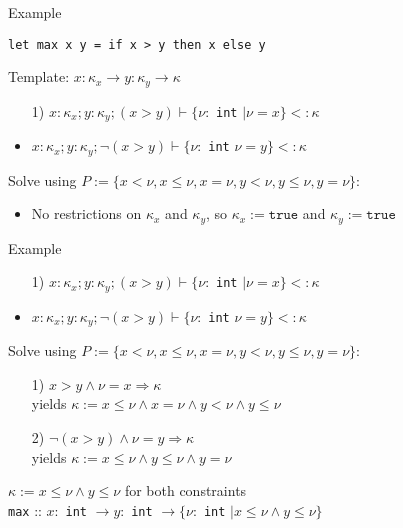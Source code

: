 \documentclass[pdf]{beamer}
\begin{document}
\begin{frame}[fragile]{Example}
  \begin{lstlisting}
let max x y = if x > y then x else y
  \end{lstlisting}
  Template: $x: \kappa_x \rightarrow y: \kappa_y \rightarrow \kappa$
  \begin{itemize}
    \item[1)] $x: \kappa_x; y: \kappa_y; (x > y) \vdash \{\nu:$ \lstinline{int} $\mid \nu = x \} <: \kappa$
    \item[2)] $x: \kappa_x; y: \kappa_y; \neg(x > y) \vdash \{\nu:$ \lstinline{int} $\nu = y \} <: \kappa$
  \end{itemize}
  Solve using $P := \{x < \nu, x \le \nu, x = \nu, y < \nu, y \le \nu, y = \nu\}$:
  \begin{itemize}
    \item No restrictions on $\kappa_x$ and $\kappa_y$, so $\kappa_x := \mathtt{true}$ and $\kappa_y := \mathtt{true}$
  \end{itemize}
\end{frame}

\begin{frame}[fragile]{Example}
  \begin{itemize}
    \item[1)] $x: \kappa_x; y: \kappa_y; (x > y) \vdash \{\nu:$ \lstinline{int} $\mid \nu = x \} <: \kappa$
    \item[2)] $x: \kappa_x; y: \kappa_y; \neg(x > y) \vdash \{\nu:$ \lstinline{int} $\nu = y \} <: \kappa$
  \end{itemize}
  Solve using $P := \{x < \nu, x \le \nu, x = \nu, y < \nu, y \le \nu, y = \nu\}$:
  \begin{itemize}
    \item[1)] $x > y \land \nu = x \Rightarrow \kappa$\\
      yields $\kappa := x \le \nu \land x = \nu \land y < \nu \land y \le \nu$
    \item[2)] $\neg(x > y) \land \nu = y \Rightarrow \kappa$\\
      yields $\kappa := x \le \nu \land y \le \nu \land y = \nu$
  \end{itemize}
  $\kappa := x \le \nu \land y \le \nu$ for both constraints\\
  \lstinline{max} :: $x:$ \lstinline{int} $\rightarrow y:$ \lstinline{int} $\rightarrow \{\nu:$ \lstinline{int} $\mid x \le \nu \land y \le \nu\}$
\end{frame}
\end{document}
